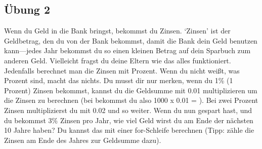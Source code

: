 \subsection*{Übung 2}
Wenn du Geld in die Bank bringst, bekommst du Zinsen. `Zinsen' ist der Geldbetrag, den du von der Bank bekommst, damit die Bank dein Geld benutzen kann---jedes Jahr bekommst du so einen kleinen Betrag auf dein Sparbuch zum anderen Geld. Vielleicht fragst du deine Eltern wie das alles funktioniert.
Jedenfalls berechnet man die Zinsen mit Prozent. Wenn du nicht weißt, was Prozent sind, macht das nichts. Du musst dir nur merken, wenn du 1\% (1 Prozent) Zinsen bekommst, kannst du die Geldsumme mit 0.01 multiplizieren um die Zinsen zu berechnen (bei  bekommst du also 1000 x 0.01 = ). Bei zwei Prozent Zinsen multiplizierst du mit 0.02 und so weiter.
Wenn du nun  gespart hast, und du bekommst 3\% Zinsen pro Jahr, wie viel Geld wirst du am Ende der nächsten 10 Jahre haben? Du kannst das mit einer for-Schleife berechnen (Tipp: zähle die Zinsen am Ende des Jahres zur Geldsumme dazu).
\newpage
